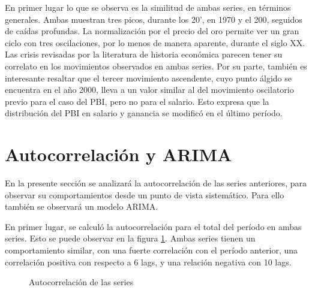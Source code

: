 \documentclass[a4paper]{article}
\begin{document}
En primer lugar lo que se observa es la similitud de ambas series, en términos generales. Ambas muestran tres picos, durante los 20', en 1970 y el 200, seguidos de caídas profundas. La normalización por el precio del oro permite ver un gran ciclo con tres oscilaciones, por lo menos de manera aparente, durante el siglo XX. Las crisis revisadas por la literatura de historia económica parecen tener su correlato en los movimientos observados en ambas series. Por su parte, también es interesante resaltar que el tercer movimiento ascendente, cuyo punto álgido se encuentra en el año 2000, lleva a un valor similar al del movimiento oscilatorio previo para el caso del PBI, pero no para el salario. Esto expresa que la distribución del PBI en salario y ganancia se modificó en el último período. 


\section{Autocorrelación y ARIMA}

En la presente sección se analizará la autocorrelación de las series anteriores, para observar su comportamientos desde un punto de vista sistemático. Para ello también se observará un modelo ARIMA. 

En primer lugar, se calculó la autocorrelación para el total del período en ambas series. Esto se puede observar en la figura \ref{fig:autocorrelacion_tot}. Ambas series tienen un comportamiento similar, con una fuerte correlación con el período anterior, una correlación positiva con respecto a 6 lags, y una relación negativa con 10 lags. 

\begin{figure}[H]
	\centering
	\caption{Autocorrelación de las series} \label{fig:autocorrelacion_tot}
\end{figure}
\end{document}
